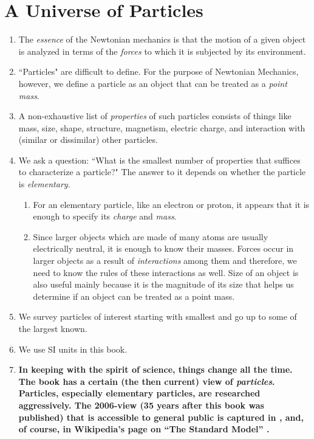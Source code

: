 \documentclass[12pt,a4paper]{book}
\begin{document}
\chapter{A Universe of Particles} \label{ch: 2-particles}
\begin{enumerate}
    \item The \emph{essence} of the Newtonian mechanics is that the motion of a given object is analyzed in terms of the \emph{forces} to which it is subjected by its environment. 
    \item ``Particles" are difficult to define. For the purpose of Newtonian Mechanics, however, we define a particle as an object that can be treated as a \emph{point mass}.
    \item A non-exhaustive list of \emph{properties} of such particles consists of things like mass, size, shape, structure, magnetism, electric charge, and interaction with (similar or dissimilar) other particles.
    \item We ask a question: ``What is the smallest number of properties that suffices to characterize a particle?" The answer to it depends on whether the particle is \emph{elementary}. 
        \begin{enumerate}
            \item For an elementary particle, like an electron or proton, it appears that it is enough to specify its \emph{charge} and \emph{mass}. 
            \item Since larger objects which are made of many atoms are usually electrically neutral, it is enough to know their masses. Forces occur in larger objects as a result of \emph{interactions} among them and therefore, we need to know the rules of these interactions as well. Size of an object is also useful mainly because it is the magnitude of its size that helps us determine if an object can be treated as a point mass.
        \end{enumerate} 
    \item We survey particles of interest starting with smallest and go up to some of the largest known.
    \item We use SI units in this book.
    \item \textbf{In keeping with the spirit of science, things change all the time. The book has a certain (the then current) view of \emph{particles}. Particles, especially elementary particles, are researched aggressively. The 2006-view (35 years after this book was published) that is accessible to general public is captured in \cite{oerter}, and, of course, in Wikipedia's page on ``The Standard Model'' \cite{the-standard-model}.} 

\end{enumerate}
\end{document}
